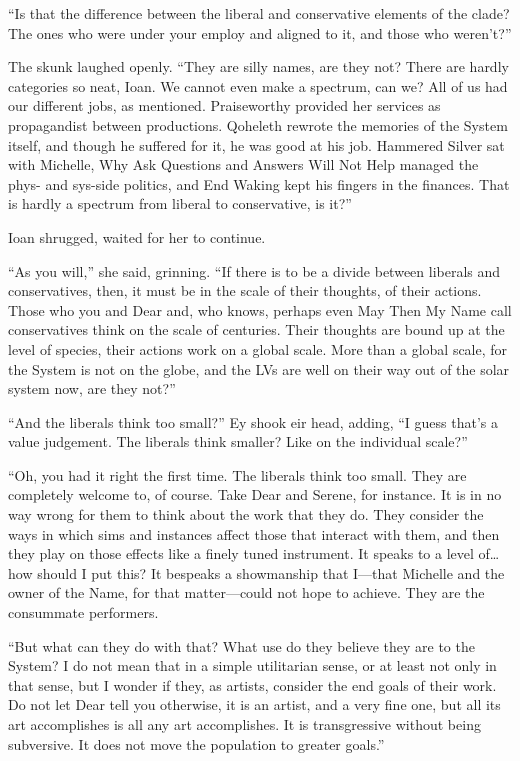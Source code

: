 ``Is that the difference between the liberal and conservative elements of the clade? The ones who were under your employ and aligned to it, and those who weren't?''

The skunk laughed openly. ``They are silly names, are they not? There are hardly categories so neat, Ioan. We cannot even make a spectrum, can we? All of us had our different jobs, as mentioned. Praiseworthy provided her services as propagandist between productions. Qoheleth rewrote the memories of the System itself, and though he suffered for it, he was good at his job. Hammered Silver sat with Michelle, Why Ask Questions and Answers Will Not Help managed the phys- and sys-side politics, and End Waking kept his fingers in the finances. That is hardly a spectrum from liberal to conservative, is it?''

Ioan shrugged, waited for her to continue.

``As you will,'' she said, grinning. ``If there is to be a divide between liberals and conservatives, then, it must be in the scale of their thoughts, of their actions. Those who you and Dear and, who knows, perhaps even May Then My Name call conservatives think on the scale of centuries. Their thoughts are bound up at the level of species, their actions work on a global scale. More than a global scale, for the System is not on the globe, and the LVs are well on their way out of the solar system now, are they not?''

``And the liberals think too small?'' Ey shook eir head, adding, ``I guess that's a value judgement. The liberals think smaller? Like on the individual scale?''

``Oh, you had it right the first time. The liberals think too small. They are completely welcome to, of course. Take Dear and Serene, for instance. It is in no way wrong for them to think about the work that they do. They consider the ways in which sims and instances affect those that interact with them, and then they play on those effects like a finely tuned instrument. It speaks to a level of\ldots how should I put this? It bespeaks a showmanship that I---that Michelle and the owner of the Name, for that matter---could not hope to achieve. They are the consummate performers.

``But what can they do with that? What use do they believe they are to the System? I do not mean that in a simple utilitarian sense, or at least not only in that sense, but I wonder if they, as artists, consider the end goals of their work. Do not let Dear tell you otherwise, it is an artist, and a very fine one, but all its art accomplishes is all any art accomplishes. It is transgressive without being subversive. It does not move the population to greater goals.''

